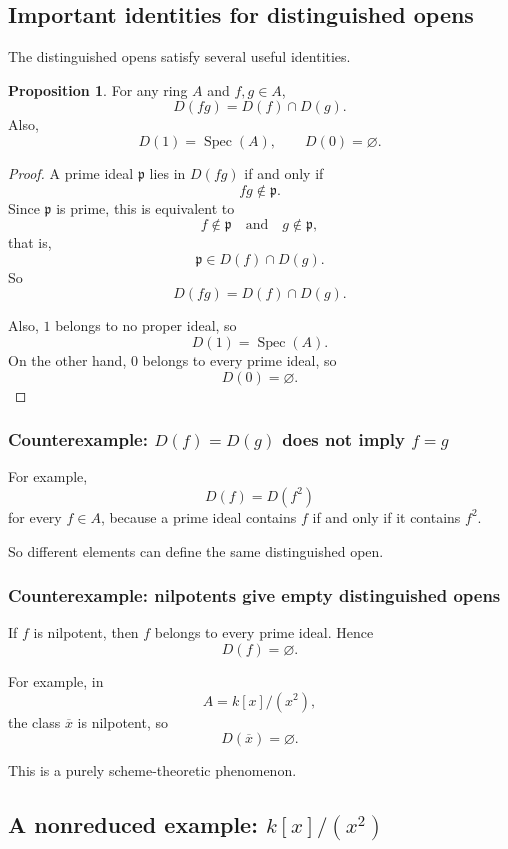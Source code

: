 \documentclass[12pt,a4paper]{article}
\theoremstyle{notespace}
\newcommand{\Spec}{\operatorname{Spec}}
\newcommand{\mf}{\mathfrak}
\theoremstyle{definition}
\newtheorem{proposition}[definition]{Proposition}
\begin{document}
\subsection{Important identities for distinguished opens}

The distinguished opens satisfy several useful identities.

\begin{proposition}
	For any ring \(A\) and \(f,g\in A\),
	\[
	D(fg)=D(f)\cap D(g).
	\]
	Also,
	\[
	D(1)=\Spec(A),
	\qquad
	D(0)=\varnothing.
	\]
\end{proposition}

\begin{proof}
	A prime ideal \(\mf p\) lies in \(D(fg)\) if and only if
	\[
	fg\notin \mf p.
	\]
	Since \(\mf p\) is prime, this is equivalent to
	\[
	f\notin \mf p
	\quad\text{and}\quad
	g\notin \mf p,
	\]
	that is,
	\[
	\mf p\in D(f)\cap D(g).
	\]
	So
	\[
	D(fg)=D(f)\cap D(g).
	\]
	
	Also, \(1\) belongs to no proper ideal, so
	\[
	D(1)=\Spec(A).
	\]
	On the other hand, \(0\) belongs to every prime ideal, so
	\[
	D(0)=\varnothing.
	\]
\end{proof}

\subsubsection{Counterexample: \(D(f)=D(g)\) does not imply \(f=g\)}

For example,
\[
D(f)=D(f^2)
\]
for every \(f\in A\), because a prime ideal contains \(f\) if and only if it contains \(f^2\).

So different elements can define the same distinguished open.

\subsubsection{Counterexample: nilpotents give empty distinguished opens}

If \(f\) is nilpotent, then \(f\) belongs to every prime ideal. Hence
\[
D(f)=\varnothing.
\]

For example, in
\[
A=k[x]/(x^2),
\]
the class \(\overline{x}\) is nilpotent, so
\[
D(\overline{x})=\varnothing.
\]

This is a purely scheme-theoretic phenomenon.

\subsection{A nonreduced example: \(k[x]/(x^2)\)}
\end{document}
